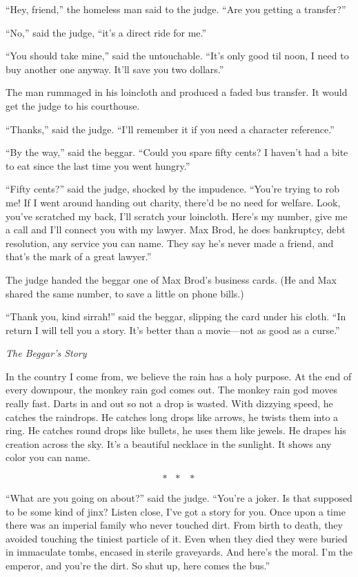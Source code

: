 \documentclass[oneside]{book}
\begin{document}
``Hey, friend,'' the homeless man said to the judge.
``Are you getting a transfer?''

``No,'' said the judge, ``it's a direct ride for me.''

``You should take mine,'' said the untouchable.
``It's only good til noon, I need to buy another one anyway.
It'll save you two dollars.''

The man rummaged in his loincloth and produced a faded bus transfer.
It would get the judge to his courthouse.

``Thanks,'' said the judge.  ``I'll remember it if you
need a character reference.''

``By the way,'' said the beggar.  ``Could you spare fifty cents?
I haven't had a bite to eat since the last time you went hungry.''

``Fifty cents?'' said the judge, shocked by the impudence.
``You're trying to rob me!
If I went around handing out charity, there'd be no need for welfare.
Look, you've scratched my back, I'll scratch your loincloth.  Here's my number,
give me a call and I'll connect you with my lawyer.  Max Brod, he
does bankruptcy, debt resolution, any service you can name.  They say he's never
made a friend, and that's the mark of a great lawyer.''

The judge handed the beggar one of Max Brod's business cards.
(He and Max shared the same number, to save a little on phone bills.)

``Thank you, kind sirrah!'' said the beggar, slipping the card under his
cloth.  ``In return I will tell you a story.  It's better than a movie---not as good as a curse.''

\vspace{2mm}
\noindent \textit{The Beggar's Story}
\vspace{2mm}

In the country I come from, we believe the rain has a holy purpose.
At the end of every downpour, the monkey rain god comes out.
The monkey rain god moves really fast.  Darts in and out so not
a drop is wasted.  With dizzying speed, he catches the raindrops.
He catches long drops like arrows, he twists them into a ring.
He catches round drops like bullets, he uses them like jewels.
He drapes his creation across the sky.  It's a beautiful necklace in
the sunlight.  It shows any color you can name.

\[*\mbox{ }*\mbox{ }*\]

``What are you going on about?'' said the judge.  ``You're a joker.
Is that supposed to be some kind of jinx?  Listen close, I've got a story for you.
Once upon a time there was an imperial family who never touched dirt.  From birth
to death, they avoided touching the tiniest particle of it.  Even when they died they
were buried in immaculate tombs, encased in sterile graveyards.  And here's the moral.
I'm the emperor, and you're the dirt.  So shut up, here comes the bus.''
\end{document}
